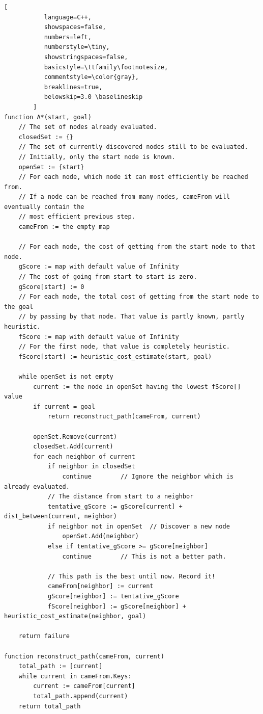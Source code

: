 \documentclass[a4paper]{article}
\begin{document}
\begin{lstlisting}[
           language=C++,
           showspaces=false,
           numbers=left,
           numberstyle=\tiny,
           showstringspaces=false,
           basicstyle=\ttfamily\footnotesize,
           commentstyle=\color{gray},
           breaklines=true,
           belowskip=3.0 \baselineskip
        ]
function A*(start, goal)
    // The set of nodes already evaluated.
    closedSet := {}
    // The set of currently discovered nodes still to be evaluated.
    // Initially, only the start node is known.
    openSet := {start}
    // For each node, which node it can most efficiently be reached from.
    // If a node can be reached from many nodes, cameFrom will eventually contain the
    // most efficient previous step.
    cameFrom := the empty map

    // For each node, the cost of getting from the start node to that node.
    gScore := map with default value of Infinity
    // The cost of going from start to start is zero.
    gScore[start] := 0 
    // For each node, the total cost of getting from the start node to the goal
    // by passing by that node. That value is partly known, partly heuristic.
    fScore := map with default value of Infinity
    // For the first node, that value is completely heuristic.
    fScore[start] := heuristic_cost_estimate(start, goal)

    while openSet is not empty
        current := the node in openSet having the lowest fScore[] value
        if current = goal
            return reconstruct_path(cameFrom, current)

        openSet.Remove(current)
        closedSet.Add(current)
        for each neighbor of current
            if neighbor in closedSet
                continue		// Ignore the neighbor which is already evaluated.
            // The distance from start to a neighbor
            tentative_gScore := gScore[current] + dist_between(current, neighbor)
            if neighbor not in openSet	// Discover a new node
                openSet.Add(neighbor)
            else if tentative_gScore >= gScore[neighbor]
                continue		// This is not a better path.

            // This path is the best until now. Record it!
            cameFrom[neighbor] := current
            gScore[neighbor] := tentative_gScore
            fScore[neighbor] := gScore[neighbor] + heuristic_cost_estimate(neighbor, goal)

    return failure

function reconstruct_path(cameFrom, current)
    total_path := [current]
    while current in cameFrom.Keys:
        current := cameFrom[current]
        total_path.append(current)
    return total_path     
       
\end{lstlisting}
\end{document}
